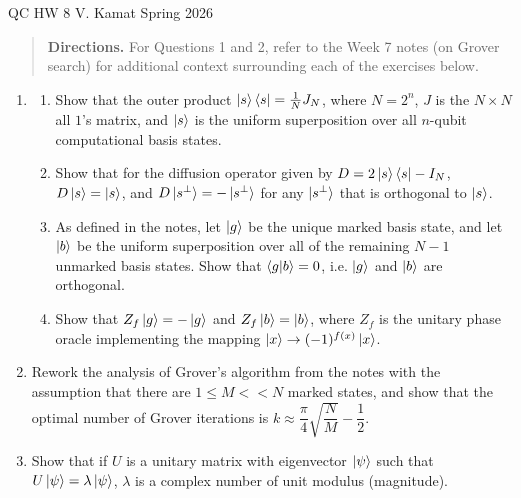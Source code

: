 \documentclass[12pt]{article}
\begin{document}
	
\centerline{QC HW 8
	\hspace{0.4 in}V. Kamat
	\hspace{0.4 in}Spring 2026}
	\begin{quote}
		{\sf
		{\bf Directions.} For Questions 1 and 2, refer to the Week 7 notes (on Grover search) for additional context surrounding each of the exercises below.  
		}
	\end{quote}
\begin{enumerate}
\item 
\begin{enumerate}
\item Show that the outer product $\ket{s}\bra{s}=\frac{1}{N}J_N$, where $N=2^n$, $J$ is the $N\times N$ all $1$'s matrix, and $\ket{s}$ is the uniform superposition over all $n$-qubit computational basis states.
\item \label{refd} Show that for the diffusion operator given by $D=2\ket{s}\bra{s}-I_N$, $D\ket{s}=\ket{s}$, and $D\ket{s^{\perp}}=-\ket{s^{\perp}}$ for any $\ket{s^{\perp}}$ that is orthogonal to $\ket{s}$.
\item As defined in the notes, let $\ket{g}$ be the unique marked basis state, and let $\ket{b}$ be the uniform superposition over all of the remaining $N-1$ unmarked basis states. Show that $\braket{g|b}=0$, i.e. $\ket{g}$ and $\ket{b}$ are orthogonal.
\item \label{refz} Show that $Z_f\ket{g}=-\ket{g}$ and $Z_f\ket{b}=\ket{b}$, where $Z_f$ is the unitary phase oracle implementing the mapping $\ket{x}\to (-1)^{f(x)}\ket{x}$. 
\end{enumerate}
\item Rework the analysis of Grover's algorithm from the notes with the assumption that there are $1\leq M<< N$ marked states, and show that the optimal number of Grover iterations is $k\approx \dfrac{\pi}{4}\sqrt{\dfrac{N}{M}}-\dfrac{1}{2}.$
\item Show that if $U$ is a unitary matrix with eigenvector $\ket{\psi}$ such that $U\ket{\psi}=\lambda\ket{\psi}$, $\lambda$ is a complex number of unit modulus (magnitude). 
\end{enumerate}
\end{document}
